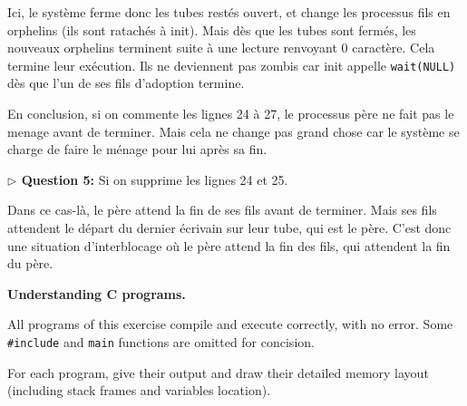 \documentclass[10pt]{article}\usepackage[enonce]{exemptty}
\begin{document}
\begin{Reponse}
Ici, le système ferme donc les tubes restés ouvert, et change les processus fils
en orphelins (ils sont ratachés à init). Mais dès que les tubes sont fermés, les
nouveaux orphelins terminent suite à une lecture renvoyant 0 caractère. Cela
termine leur exécution. Ils ne deviennent pas zombis car init appelle
\texttt{wait(NULL)} dès que l'un de ses fils d'adoption termine.

En conclusion, si on commente les lignes 24 à 27, le processus père ne fait pas
le menage avant de terminer. Mais cela ne change pas grand chose car le système
se charge de faire le ménage pour lui après sa fin.

\bigskip\noindent\textbf{$\triangleright$ Question 5:} Si on supprime les lignes 24 et 25.

Dans ce cas-là, le père attend la fin de ses fils avant de terminer. Mais ses
fils attendent le départ du dernier écrivain sur leur tube, qui est le
père. C'est donc une situation d'interblocage où le père attend la fin des fils,
qui attendent la fin du père.

\end{Reponse}


\newpage\Exercise\textbf{Understanding C programs.}

All programs of this exercise compile and execute correctly, with no error. Some
\texttt{\#include} and \texttt{main} functions are omitted for concision.

For each program, give their output and draw their detailed memory layout
(including stack frames and variables location).
\end{document}
